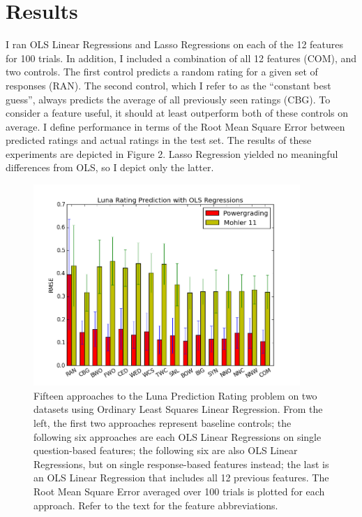 \section{Results}
I ran OLS Linear Regressions and Lasso Regressions on each of the 12 features for 100 trials. In addition, I included a combination of all 12 features (COM), and two controls. The first control predicts a random rating for a given set of responses (RAN). The second control, which I refer to as the ``constant best guess'', always predicts the average of all previously seen ratings (CBG). To consider a feature useful, it should at least outperform both of these controls on average. I define performance in terms of the Root Mean Square Error between predicted ratings and actual ratings in the test set. The results of these experiments are depicted in Figure 2. Lasso Regression yielded no meaningful differences from OLS, so I depict only the latter.
\begin{figure}[h]
\centerline{%
\includegraphics[width=0.9\textwidth]{figures/ratingPredictionFinalResults.png}%
}%
\caption{Fifteen approaches to the Luna Prediction Rating problem on two datasets using Ordinary Least Squares Linear Regression. From the left, the first two approaches represent baseline controls; the following six approaches are each OLS Linear Regressions on single question-based features; the following six are also OLS Linear Regressions, but on single response-based features instead; the last is an OLS Linear Regression that includes all 12 previous features. The Root Mean Square Error averaged over 100 trials is plotted for each approach. Refer to the text for the feature abbreviations.}
\label{fig:RatingDistribution}
\end{figure}

